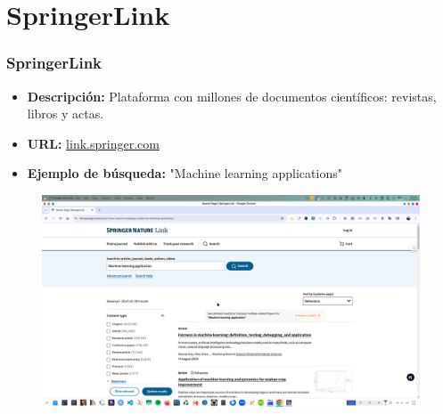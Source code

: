 \documentclass[
11pt, %
]{beamer}
\begin{document}
\section{SpringerLink}
\begin{frame}
	\frametitle{SpringerLink}
	\begin{itemize}
		\item \textbf{Descripción:} Plataforma con millones de documentos científicos: revistas, libros y actas.
		\item \textbf{URL:} \href{https://link.springer.com}{link.springer.com}
		\item \textbf{Ejemplo de búsqueda:} "Machine learning applications"
	\end{itemize}
			\begin{figure}
		\centering
		\includegraphics[width=0.9\linewidth]{images/springerlink.png}
		\label{fig:screenshot010}
	\end{figure}
\end{frame}

\end{document}
